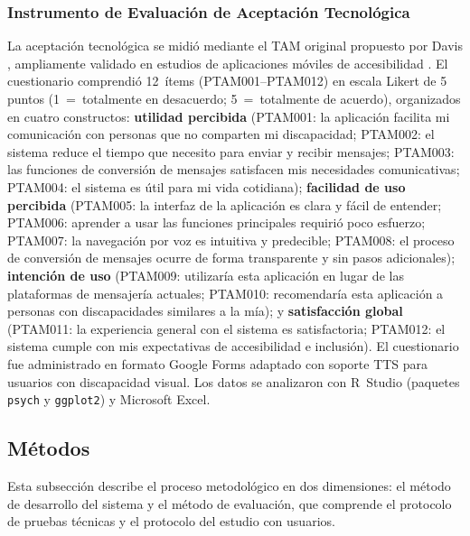 \documentclass[journal]{IEEEtran}
\begin{document}
			\subsubsection{Instrumento de Evaluaci\'on de Aceptaci\'on Tecnol\'ogica}
				La aceptaci\'on tecnol\'ogica se midi\'o mediante el TAM original propuesto por Davis \cite{davis1989}, ampliamente validado en estudios de aplicaciones m\'oviles de accesibilidad \cite{julianto2023}. El cuestionario comprendi\'o 12~\'items (PTAM001--PTAM012) en escala Likert de 5 puntos (1~=~totalmente en desacuerdo; 5~=~totalmente de acuerdo), organizados en cuatro constructos: \textbf{utilidad percibida} (PTAM001: la aplicaci\'on facilita mi comunicaci\'on con personas que no comparten mi discapacidad; PTAM002: el sistema reduce el tiempo que necesito para enviar y recibir mensajes; PTAM003: las funciones de conversi\'on de mensajes satisfacen mis necesidades comunicativas; PTAM004: el sistema es \'util para mi vida cotidiana); \textbf{facilidad de uso percibida} (PTAM005: la interfaz de la aplicaci\'on es clara y f\'acil de entender; PTAM006: aprender a usar las funciones principales requiri\'o poco esfuerzo; PTAM007: la navegaci\'on por voz es intuitiva y predecible; PTAM008: el proceso de conversi\'on de mensajes ocurre de forma transparente y sin pasos adicionales); \textbf{intenci\'on de uso} (PTAM009: utilizar\'ia esta aplicaci\'on en lugar de las plataformas de mensajer\'ia actuales; PTAM010: recomendar\'ia esta aplicaci\'on a personas con discapacidades similares a la m\'ia); y \textbf{satisfacci\'on global} (PTAM011: la experiencia general con el sistema es satisfactoria; PTAM012: el sistema cumple con mis expectativas de accesibilidad e inclusi\'on). El cuestionario fue administrado en formato Google Forms adaptado con soporte TTS para usuarios con discapacidad visual. Los datos se analizaron con R~Studio (paquetes \texttt{psych} y \texttt{ggplot2}) y Microsoft Excel.
				
		\subsection{M\'etodos}
			Esta subsecci\'on describe el proceso metodol\'ogico en dos dimensiones: el m\'etodo de desarrollo del sistema y el m\'etodo de evaluaci\'on, que comprende el protocolo de pruebas t\'ecnicas y el protocolo del estudio con usuarios.
			
\end{document}
